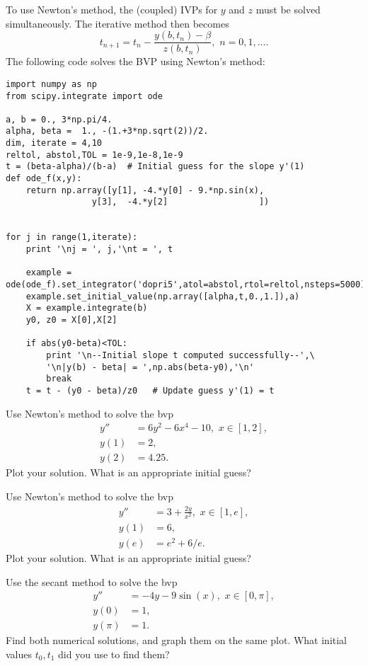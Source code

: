 To use Newton's method, the (coupled) IVPs for $y$ and $z$ must be solved simultaneously. The iterative method then becomes 
\[
t_{n+1} = t_n - \frac{ y(b,t_n) - \beta}{z(b,t_n)}, \,\, n = 0,1,\hdots
.\]
The following code solves the BVP using Newton's method: 
\begin{lstlisting}
import numpy as np
from scipy.integrate import ode

a, b = 0., 3*np.pi/4.
alpha, beta =  1., -(1.+3*np.sqrt(2))/2.
dim, iterate = 4,10
reltol, abstol,TOL = 1e-9,1e-8,1e-9
t = (beta-alpha)/(b-a)  # Initial guess for the slope y'(1)
def ode_f(x,y): 
	return np.array([y[1], -4.*y[0] - 9.*np.sin(x), 
				 y[3],  -4.*y[2]                  ])
	
	
for j in range(1,iterate):
	print '\nj = ', j,'\nt = ', t
		
	example = ode(ode_f).set_integrator('dopri5',atol=abstol,rtol=reltol,nsteps=5000) 
	example.set_initial_value(np.array([alpha,t,0.,1.]),a) 
	X = example.integrate(b)
	y0, z0 = X[0],X[2]

	if abs(y0-beta)<TOL: 
		print '\n--Initial slope t computed successfully--',\
		'\n|y(b) - beta| = ',np.abs(beta-y0),'\n'
		break
	t = t - (y0 - beta)/z0   # Update guess y'(1) = t
\end{lstlisting}


\begin{problem}
Use Newton's method to solve the bvp
\begin{equation*}
\begin{split}
y'' &= 6y^2-6x^4-10, \,\, x \in [1,2],\\
y(1) &= 2, \\
y(2) &= 4.25.
\end{split}
\end{equation*}
Plot your solution. What is an appropriate initial guess? 
\end{problem}

\begin{problem}
Use Newton's method to solve the bvp
\begin{equation*}
\begin{split}
y'' &= 3 + \frac{2y}{x^2}, \,\, x \in [1,e],\\
y(1) &= 6, \\
y(e) &= e^2 + 6/e.
\end{split}
\end{equation*}
Plot your solution. What is an appropriate initial guess? 
\end{problem}

\begin{problem} Use the secant method to solve the bvp
\begin{equation*}
\begin{split}
y'' &= -4y -9\sin(x), \,\, x \in [0,\pi],\\
y(0) &= 1, \\
y(\pi) &=1.
\end{split}
\end{equation*}
Find both numerical solutions, and graph them on the same plot. What initial values $t_0, t_1$ did you use to find them?  
\end{problem}



